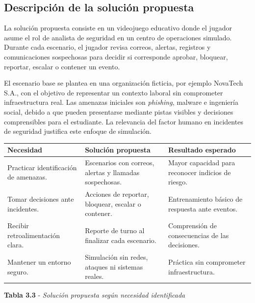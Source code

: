 \subsection{Descripci\'{o}n de la soluci\'{o}n propuesta}

La soluci\'{o}n propuesta consiste en un videojuego educativo donde el jugador asume el rol de analista de seguridad en un centro de operaciones simulado. Durante cada escenario, el jugador revisa correos, alertas, registros y comunicaciones sospechosas para decidir si corresponde aprobar, bloquear, reportar, escalar o contener un evento.

El escenario base se plantea en una organizaci\'{o}n ficticia, por ejemplo NovaTech S.A., con el objetivo de representar un contexto laboral sin comprometer infraestructura real. Las amenazas iniciales son \textit{phishing}, malware e ingenier\'{i}a social, debido a que pueden presentarse mediante pistas visibles y decisiones comprensibles para el estudiante. La relevancia del factor humano en incidentes de seguridad justifica este enfoque de simulaci\'{o}n.

\begin{center}

\vspace{0.2cm}
\begin{tabular}{|p{}|p{}|p{}|}
\hline
\textbf{Necesidad} & \textbf{Soluci\'{o}n propuesta} & \textbf{Resultado esperado} \\
\hline
Practicar identificaci\'{o}n de amenazas. & Escenarios con correos, alertas y llamadas sospechosas. & Mayor capacidad para reconocer indicios de riesgo. \\
\hline
Tomar decisiones ante incidentes. & Acciones de reportar, bloquear, escalar o contener. & Entrenamiento b\'{a}sico de respuesta ante eventos. \\
\hline
Recibir retroalimentaci\'{o}n clara. & Reporte de turno al finalizar cada escenario. & Comprensi\'{o}n de consecuencias de las decisiones. \\
\hline
Mantener un entorno seguro. & Simulaci\'{o}n sin redes, ataques ni sistemas reales. & Pr\'{a}ctica sin comprometer infraestructura. \\
\hline
\end{tabular}

\textbf{Tabla 3.3} - \textit{Soluci\'{o}n propuesta seg\'{u}n necesidad identificada}

\end{center}

